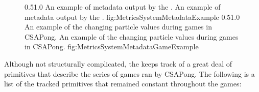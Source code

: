 \begin{figure}
\addtocounter{figure}{-1}
	{0.5}{1.0}
	{An example of metadata output by the .}
	{An example of metadata output by the .}
	{fig:MetricsSystemMetadataExample}
	{0.5}{1.0}
	{An example of the changing particle values during games in CSAPong.}
	{An example of the changing particle values during games in CSAPong.}
	{fig:MetricsSystemMetadataGameExample}
\end{figure}


Although not structurally complicated, the  keeps track of a great deal of primitives that describe the series of games ran by CSAPong. The following is a list of the tracked primitives that remained constant throughout the games:

